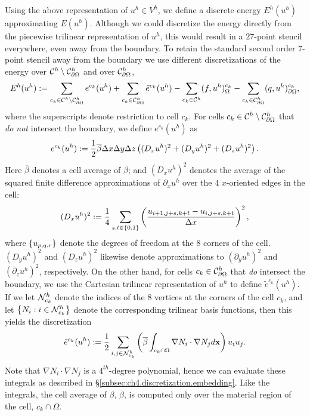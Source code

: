 Using the above representation of $u^h \in V^h$, we define a discrete energy $E^h(u^h)$ approximating $E(u^h)$. Although we could discretize the energy directly from the piecewise trilinear representation of $u^h$, this would result in a $27$-point stencil everywhere, even away from the boundary. To retain the standard second order $7$-point stencil away from the boundary we use different discretizations of the energy over $\mathcal{C}^h \setminus \mathcal{C}^h_{\partial\Omega}$ and over $\mathcal{C}^h_{\partial\Omega}$,
\begin{equation} \label{eq:ch4.neumann.energy.discrete}
E^h(u^h) := \sum_{c_k \in \mathcal{C}^h \setminus \mathcal{C}_{\partial\Omega}^h} e^{c_k}(u^h) + \sum_{c_k \in \mathcal{C}_{\partial\Omega}^h} \tilde{e}^{c_k}(u^h) - \sum_{c_k \in \mathcal{C}^h} (f, u^h)^{c_k}_{\Omega} - \sum_{c_k \in \mathcal{C}_{\partial\Omega}^h} (q, u^h)^{c_k}_{\partial\Omega},
\end{equation}
where the superscripts denote restriction to cell $c_k$. For cells $c_k \in \mathcal{C}^h \setminus \mathcal{C}^h_{\partial\Omega}$ that \emph{do not} intersect the boundary, we define $e^{c_k}(u^h)$ as
\begin{equation*}
e^{c_k}(u^h) := \frac{1}{2} \overline{\beta} \Delta x \Delta y \Delta z \left( (D_x u^h)^2 + (D_y u^h)^2 + (D_z u^h)^2 \right).
\end{equation*}
Here $\overline{\beta}$ denotes a cell average of $\beta$; and $(D_x u^h)^2$ denotes the average of the squared finite difference approximations of $\partial_x u^h$ over the $4$ $x$-oriented edges in the cell:
\begin{equation*}
(D_x u^h)^2 := \frac{1}{4} \sum_{s,t \in \left\lbrace 0,1 \right\rbrace} \left( \frac{u_{i+1,j+s,k+t} - u_{i,j+s,k+t}}{\Delta x} \right)^2,
\end{equation*}
where $\left\lbrace u_{p,q,r} \right\rbrace$ denote the degrees of freedom at the $8$ corners of the cell. $(D_y u^h)^2$ and $(D_z u^h)^2$ likewise denote approximations to $(\partial_y u^h)^2$ and $(\partial_z u^h)^2$, respectively. On the other hand, for cells $c_k \in \mathcal{C}^h_{\partial\Omega}$ that \emph{do} intersect the boundary, we use the Cartesian trilinear representation of $u^h$ to define $\tilde{e}^{c_k}(u^h)$. If we let $\mathcal{N}^h_{c_k}$ denote the indices of the $8$ vertices at the corners of the cell $c_k$, and let $\left\lbrace N_i : i \in \mathcal{N}^h_{c_k} \right\rbrace$ denote the corresponding trilinear basis functions, then this yields the discretization
\begin{equation} \label{eq:ch4.neumann.energy.boundary}
\tilde{e}^{c_k}(u^h) := \frac{1}{2} \sum_{i,j \in \mathcal{N}^h_{c_k}} \left( \overline{\beta} \int_{c_k \cap \Omega} \nabla N_i \cdot \nabla N_j d\mathbf{x} \right) u_i u_j.
\end{equation}
Note that $\nabla N_i \cdot \nabla N_j$ is a $4^{th}$-degree polynomial, hence we can evaluate these integrals as described in \S\ref{subsec:ch4.discretization.embedding}. Like the integrals, the cell average of $\beta$, $\overline{\beta}$, is computed only over the material region of the cell, $c_k \cap \Omega$.

